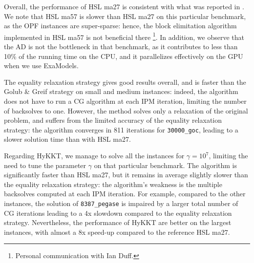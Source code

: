 Overall, the performance of HSL ma27 is consistent with what was reported
in \cite{babaeinejadsarookolaee2019power}. We note that HSL ma57 is slower
than HSL ma27 on this particular benchmark, as the OPF instances are super-sparse:
hence, the block elimitation algorithm implemented in HSL ma57 is not beneficial there
\footnote{Personal communication with Ian Duff.}. In addition, we observe that
the AD is not the bottleneck in that benchmark, as it contributes to less than 10\% of
the running time on the CPU, and it parallelizes effectively on the GPU when we use ExaModels.

The equality relaxation strategy gives good results overall, and is faster than
the Golub \& Greif strategy on small and medium instances: indeed, the algorithm
does not have to run a CG algorithm at each IPM iteration, limiting the number
of backsolves to one. However, the method solves only a relaxation of the original
problem, and suffers from the limited accuracy of the equality relaxation strategy:
the algorithm converges in 811 iterations for {\tt 30000\_goc}, leading to a slower
solution time than with HSL ma27.

Regarding HyKKT, we manage to solve all the instances for $\gamma = 10^7$, limiting
the need to tune the parameter $\gamma$ on that particular benchmark. The algorithm
is significantly faster than HSL ma27, but it remains in average slightly slower
than the equality relaxation strategy: the algorithm's weakness is the multiple
backsolves computed at each IPM iteration. For example, compared
to the other instances, the solution of {\tt 8387\_pegase} is impaired
by a larger total number of CG iterations leading to a 4x slowdown compared
to the equality relaxation strategy.
Nevertheless, the performance of HyKKT are better on the largest instances,
with almost a 8x speed-up compared to the reference HSL ma27.

